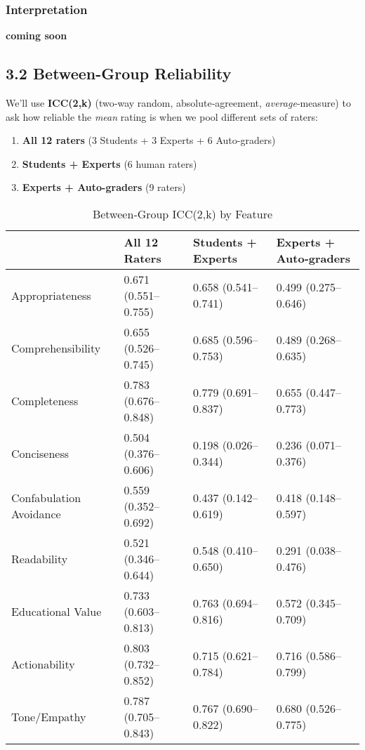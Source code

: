 \documentclass[
  11pt]{report}
\providecommand{\tightlist}{%
  \setlength{\itemsep}{0pt}\setlength{\parskip}{0pt}}\usepackage{longtable,booktabs,array}
\begin{document}
\subsubsection{Interpretation}\label{interpretation-1}

\textbf{coming soon}

\subsection{3.2 Between-Group
Reliability}\label{between-group-reliability}

We'll use \textbf{ICC(2,k)} (two‐way random, absolute‐agreement,
\emph{average}‐measure) to ask how reliable the \emph{mean} rating is
when we pool different sets of raters:

\begin{enumerate}
\def\labelenumi{\arabic{enumi}.}
\tightlist
\item
  \textbf{All 12 raters} (3 Students + 3 Experts + 6 Auto-graders)\\
\item
  \textbf{Students + Experts} (6 human raters)\\
\item
  \textbf{Experts + Auto-graders} (9 raters)
\end{enumerate}

\begin{table}
\caption*{
{\large Between‐Group ICC(2,k) by Feature}
} 
\fontsize{12.0pt}{14.4pt}\selectfont
\begin{tabular*}{\linewidth}{@{\extracolsep{\fill}}l|lll}
\toprule
 & All 12 Raters & Students + Experts & Experts + Auto‐graders \\ 
\midrule\addlinespace[2.5pt]
Appropriateness & 0.671 (0.551–0.755) & 0.658 (0.541–0.741) & 0.499 (0.275–0.646) \\ 
Comprehensibility & 0.655 (0.526–0.745) & 0.685 (0.596–0.753) & 0.489 (0.268–0.635) \\ 
Completeness & 0.783 (0.676–0.848) & 0.779 (0.691–0.837) & 0.655 (0.447–0.773) \\ 
Conciseness & 0.504 (0.376–0.606) & 0.198 (0.026–0.344) & 0.236 (0.071–0.376) \\ 
Confabulation Avoidance & 0.559 (0.352–0.692) & 0.437 (0.142–0.619) & 0.418 (0.148–0.597) \\ 
Readability & 0.521 (0.346–0.644) & 0.548 (0.410–0.650) & 0.291 (0.038–0.476) \\ 
Educational Value & 0.733 (0.603–0.813) & 0.763 (0.694–0.816) & 0.572 (0.345–0.709) \\ 
Actionability & 0.803 (0.732–0.852) & 0.715 (0.621–0.784) & 0.716 (0.586–0.799) \\ 
Tone/Empathy & 0.787 (0.705–0.843) & 0.767 (0.690–0.822) & 0.680 (0.526–0.775) \\ 
\bottomrule
\end{tabular*}
\end{table}
\end{document}
